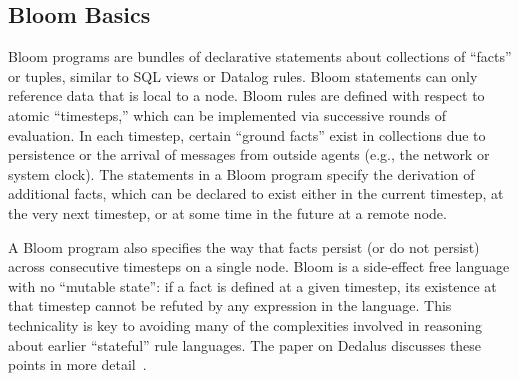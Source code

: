 \subsection{Bloom Basics}

Bloom programs are bundles of declarative statements about collections of
``facts'' or tuples, similar to SQL views or Datalog rules.  Bloom statements can
only reference data that is local to a node.  Bloom rules are defined with
respect to atomic ``timesteps,'' which can be implemented via successive rounds
of evaluation. In each timestep, certain ``ground facts'' exist in collections
due to persistence or the arrival of messages from outside agents (e.g., the
network or system clock).  The statements in a Bloom program specify the
derivation of additional facts, which can be declared to exist either in the
current timestep, at the very next timestep, or at some time in the future at a
remote node.

A Bloom program also specifies the way that facts persist (or do not persist)
across consecutive timesteps on a single node.  Bloom is a side-effect free
language with no ``mutable state'': if a fact is defined at a given timestep,
its existence at that timestep cannot be refuted by any expression in the
language.  This technicality is key to avoiding many of the complexities
involved in reasoning about earlier ``stateful'' rule languages.  The paper on
Dedalus discusses these points in more detail~\cite{dedalus}.

